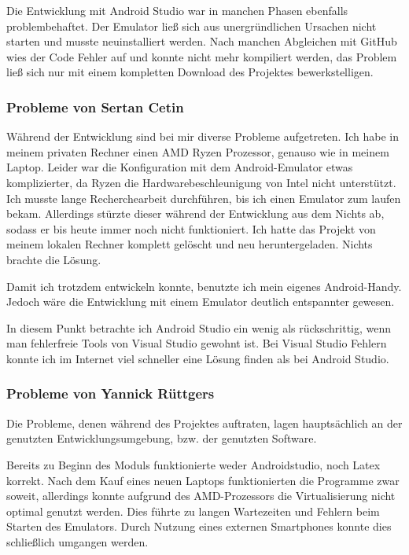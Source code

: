 Die Entwicklung mit Android Studio war in manchen Phasen ebenfalls problembehaftet. Der Emulator ließ sich aus unergründlichen Ursachen nicht starten und musste neuinstalliert werden. Nach manchen Abgleichen mit GitHub wies der Code Fehler auf und konnte nicht mehr kompiliert werden, das Problem ließ sich nur mit einem kompletten Download des Projektes bewerkstelligen. 

\subsubsection{Probleme von Sertan Cetin}
Während der Entwicklung sind bei mir diverse Probleme aufgetreten. Ich habe in meinem privaten Rechner einen AMD Ryzen Prozessor, genauso wie in meinem Laptop. Leider war die Konfiguration mit dem Android-Emulator etwas komplizierter, da Ryzen die Hardwarebeschleunigung von Intel nicht unterstützt. Ich musste lange Recherchearbeit durchführen, bis ich einen Emulator zum laufen bekam. Allerdings stürzte dieser während der Entwicklung aus dem Nichts ab, sodass er bis heute immer noch nicht funktioniert. Ich hatte das Projekt von meinem lokalen Rechner komplett gelöscht und neu heruntergeladen. Nichts brachte die Lösung.

Damit ich trotzdem entwickeln konnte, benutzte ich mein eigenes Android-Handy. Jedoch wäre die Entwicklung mit einem Emulator deutlich entspannter gewesen.

In diesem Punkt betrachte ich Android Studio ein wenig als rückschrittig, wenn man fehlerfreie Tools von Visual Studio gewohnt ist. Bei Visual Studio Fehlern konnte ich im Internet viel schneller eine Lösung finden als bei Android Studio.

\subsubsection{Probleme von Yannick Rüttgers}

Die Probleme, denen während des Projektes auftraten, lagen hauptsächlich an der genutzten Entwicklungsumgebung, bzw. der genutzten Software.

Bereits zu Beginn des Moduls funktionierte weder Androidstudio, noch Latex korrekt. Nach dem Kauf eines neuen Laptops funktionierten die Programme zwar soweit, allerdings konnte aufgrund des AMD-Prozessors die Virtualisierung nicht optimal genutzt werden. Dies führte zu langen Wartezeiten und Fehlern beim Starten des Emulators. Durch Nutzung eines externen Smartphones konnte dies schließlich umgangen werden.



